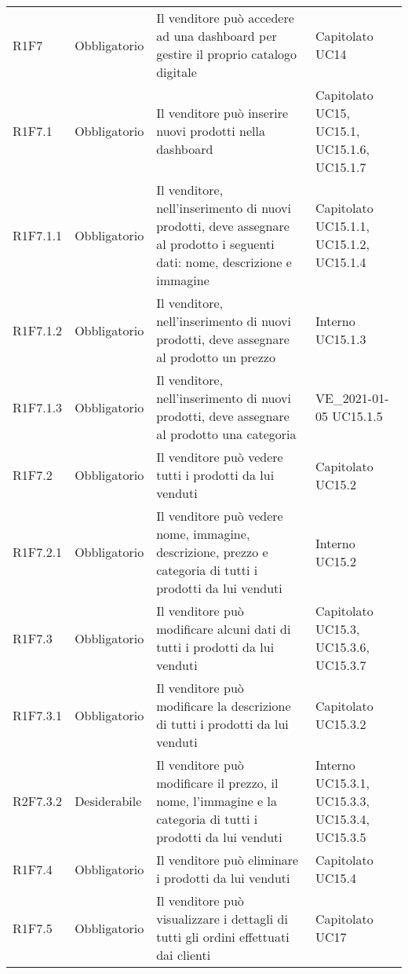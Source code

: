{\begin{longtable}{C{2.5cm} C{2.8cm} C{6.7cm} C{2.5cm}}
R1F7 & Obbligatorio & Il venditore può accedere ad una dashboard per gestire il proprio catalogo digitale & Capitolato \newline UC14\\
R1F7.1 & Obbligatorio & Il venditore può inserire nuovi prodotti nella dashboard & Capitolato \newline UC15, UC15.1, UC15.1.6, UC15.1.7\\
R1F7.1.1 & Obbligatorio & Il venditore, nell'inserimento di nuovi prodotti, deve assegnare al prodotto i seguenti dati: nome, descrizione e immagine & Capitolato \newline UC15.1.1, UC15.1.2, UC15.1.4\\
R1F7.1.2 & Obbligatorio & Il venditore, nell'inserimento di nuovi prodotti, deve assegnare al prodotto un prezzo & Interno \newline UC15.1.3\\ 
R1F7.1.3 & Obbligatorio & Il venditore, nell'inserimento di nuovi prodotti, deve assegnare al prodotto una categoria & VE\_2021-01-05 \newline UC15.1.5\\ 
R1F7.2 & Obbligatorio & Il venditore può vedere tutti i prodotti da lui venduti & Capitolato \newline UC15.2 \\
R1F7.2.1 & Obbligatorio & Il venditore può vedere nome, immagine, descrizione, prezzo e categoria di tutti i prodotti da lui venduti & Interno \newline UC15.2\\
R1F7.3 & Obbligatorio & Il venditore può modificare alcuni dati di tutti i prodotti da lui venduti & Capitolato \newline UC15.3, UC15.3.6, UC15.3.7 \\
R1F7.3.1 & Obbligatorio & Il venditore può modificare la descrizione di tutti i prodotti da lui venduti & Capitolato \newline UC15.3.2\\
R2F7.3.2 & Desiderabile & Il venditore può modificare il prezzo, il nome, l'immagine e la categoria di tutti i prodotti da lui venduti & Interno \newline UC15.3.1, UC15.3.3, UC15.3.4, UC15.3.5\\
R1F7.4 & Obbligatorio & Il venditore può eliminare i prodotti da lui venduti & Capitolato \newline UC15.4 \\
R1F7.5 & Obbligatorio & Il venditore può visualizzare i dettagli di tutti gli ordini effettuati dai clienti & Capitolato \newline UC17\\

\end{longtable}}
